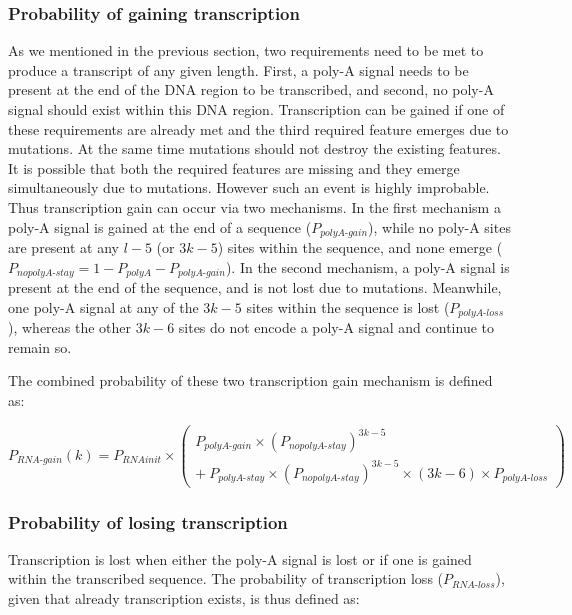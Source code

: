 \documentclass[12pt,a4paper]{article}
\newcommand{\cmnt}[1]{{\color{purple} #1}}
\begin{document}
\subsubsection{Probability of gaining transcription}

\cmnt{As we mentioned in the previous section, two requirements need to be met to produce a transcript of any given length. First, a poly-A signal needs to be present at the end of the DNA region to be transcribed, and second, no poly-A signal should exist within this DNA region. Transcription can be gained if one of these requirements are already met and the third required feature emerges due to mutations. At the same time mutations should not destroy the existing features. It is possible that both the required features are missing and they emerge simultaneously due to mutations. However such an event is highly improbable. Thus transcription gain can occur via two mechanisms. In the first mechanism a poly-A signal is gained at the end of a sequence ($P_\textit{polyA-gain}$), while no poly-A sites are present at any $l-5$ (or $3k-5$) sites within the sequence, and none emerge ($P_\textit{nopolyA-stay} = 1 - P_\textit{polyA} - P_\textit{polyA-gain}$). In the second mechanism, a poly-A signal is present at the end of the sequence, and is not lost due to mutations. Meanwhile, one poly-A signal at any of the $3k-5$ sites within the sequence is lost ($P_\textit{polyA-loss}$), whereas the other $3k-6$ sites do not encode a poly-A signal and continue to remain so.

The combined probability of these two transcription gain mechanism is defined as:

\begin{equation}
P_\textit{RNA-gain}(k) = P_\textit{RNAinit} \times \begin{pmatrix}
P_\textit{polyA-gain}\times (P_\textit{nopolyA-stay})^{3k-5} \\[1em]
 +\  P_\textit{polyA-stay}\times (P_\textit{nopolyA-stay})^{3k-5} \times (3k-6) \times P_\textit{polyA-loss}
\end{pmatrix}  
\label{eqrnagain}
\end{equation}

\subsubsection{Probability of losing transcription}

Transcription is lost when either the poly-A signal is lost or if one is gained within the transcribed sequence. The probability of transcription loss ($P_\textit{RNA-loss}$), given that already transcription exists, is thus defined as:

}
\end{document}
